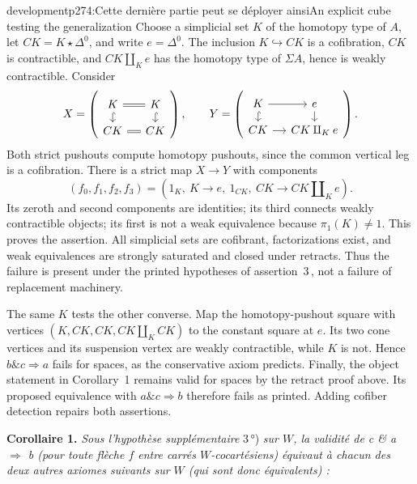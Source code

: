 \begin{dcomment}{development}{p274:Cette dernière partie peut se déployer ainsi}{An explicit cube testing the generalization}
Choose a simplicial set $K$ of the homotopy type of $A$, let $CK=K\star\Delta^0$, and write $e=\Delta^0$. The inclusion $K\hookrightarrow CK$ is a cofibration, $CK$ is contractible, and $CK\amalg_K e$ has the homotopy type of $\Sigma A$, hence is weakly contractible. Consider
\[
 X=\left(\begin{tikzcd}[ampersand replacement=\&, column sep=small,row sep=small]
 K\arrow[r,equal]\arrow[d,hook] \& K\arrow[d,hook]\\
 CK\arrow[r,equal] \& CK
 \end{tikzcd}\right),\qquad
 Y=\left(\begin{tikzcd}[ampersand replacement=\&, column sep=small,row sep=small]
 K\arrow[r]\arrow[d,hook] \& e\arrow[d]\\
 CK\arrow[r] \& CK\amalg_K e
 \end{tikzcd}\right).
\]
Both strict pushouts compute homotopy pushouts, since the common vertical leg is a cofibration. There is a strict map $X\to Y$ with components
\[
 (f_0,f_1,f_2,f_3)=(1_K,\ K\to e,\ 1_{CK},\ CK\to CK\amalg_K e).
\]
Its zeroth and second components are identities; its third connects weakly contractible objects; its first is not a weak equivalence because $\pi_1(K)\ne1$. This proves the assertion. All simplicial sets are cofibrant, factorizations exist, and weak equivalences are strongly saturated and closed under retracts. Thus the failure is present under the printed hypotheses of assertion~3\,\textdegree{}, not a failure of replacement machinery.

The same $K$ tests the other converse. Map the homotopy-pushout square with vertices $(K,CK,CK,CK\amalg_K CK)$ to the constant square at $e$. Its two cone vertices and its suspension vertex are weakly contractible, while $K$ is not. Hence $b\mathbin{\&}c\Rightarrow a$ fails for spaces, as the conservative axiom predicts. Finally, the object statement in Corollary~1 remains valid for spaces by the retract proof above. Its proposed equivalence with $a\mathbin{\&}c\Rightarrow b$ therefore fails as printed. Adding cofiber detection repairs both assertions.
\end{dcomment}


\textbf{Corollaire 1.} \textit{Sous l'hypothèse supplémentaire} \textup{3\,°)} \textit{sur $W$, la validité de c \& a $\Longrightarrow$ b (pour toute flèche $f$ entre carrés $W$-cocartésiens) équivaut à chacun des deux autres axiomes suivants sur $W$ (qui sont donc équivalents) :}

